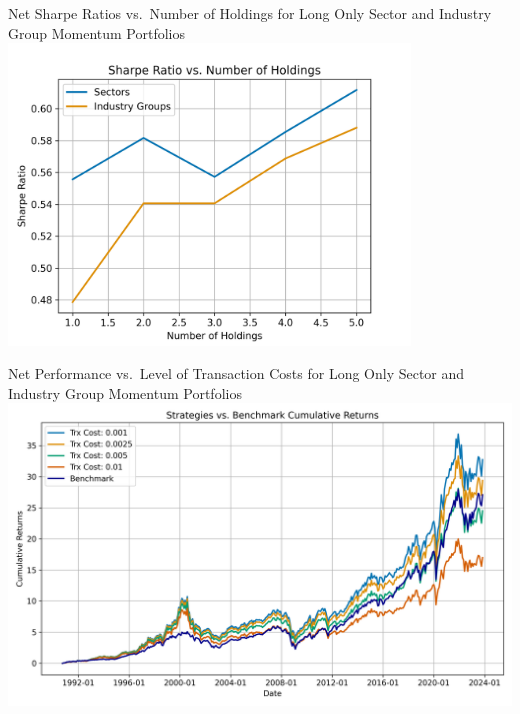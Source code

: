 \documentclass{beamer}
\begin{document}
\begin{frame}{Net Sharpe Ratios vs.~Number of Holdings for Long Only Sector and Industry Group Momentum Portfolios}
    \centering %
    \includegraphics[width=0.8\textwidth]{Figures/robustness_check_holdings.png}    
\end{frame}

\begin{frame}{Net Performance vs.~Level of Transaction Costs for Long Only Sector and Industry Group Momentum Portfolios}
    \centering %
    \includegraphics[width=1\textwidth]{Figures/robustness_check_tc.png}    
\end{frame}
\end{document}
